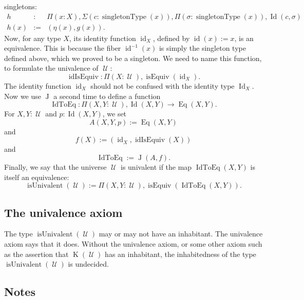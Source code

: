 \documentclass{article}
\newcommand{\Id}{\operatorname{Id}}
\newcommand{\J}{\operatorname{J}}
\newcommand{\K}{\operatorname{K}}
\newcommand{\U}{\operatorname{\mathcal{U}}}
\newcommand{\isEquiv}{\operatorname{isEquiv}}
\newcommand{\Eq}{\operatorname{Eq}}
\newcommand{\singletonType}{\operatorname{singletonType}}
\newcommand{\id}{\operatorname{id}}
\newcommand{\idIsEquiv}{\operatorname{idIsEquiv}}
\newcommand{\IdToEq}{\operatorname{IdToEq}}
\newcommand{\isUnivalent}{\operatorname{isUnivalent}}
\begin{document}
singletons:
\begin{eqnarray*}
   h & : & \Pi(x:X), \Sigma(c:\singletonType(x)), \Pi(\sigma :\singletonType(x)), \Id(c,\sigma )\\
   h(x) & := & (\eta(x),g(x)).
\end{eqnarray*}
Now, for any type $X$, its identity function $\id_X$, defined by
$\id(x) := x$, is an equivalence. This is because the fiber
$\id^{-1}(x)$ is simply the singleton type defined above, which we
proved to be a singleton. We need to name this function, 
to formulate the univalence of $\U$:
\[
   \idIsEquiv : \Pi(X:\U), \isEquiv(\id_X).
 \]
The identity function $\id_X$ should not be confused with the identity
type $\Id_X$. Now we use $\J$ a second time to define a function
\[
   \IdToEq : \Pi(X,Y:\U), \Id(X,Y) \to  \Eq(X,Y).
\]
For $X,Y:\U$ and $p:\Id(X,Y)$, we set
\[
   A(X,Y,p) := \Eq(X,Y)
\]  
and
\[
   f(X) := (\id_X , \idIsEquiv(X))
\]
and
\[
   \IdToEq := \J(A,f).
\]
Finally, we say that the universe $\U$ is univalent if the map
$\IdToEq(X,Y)$ is itself an equivalence:
\[
   \isUnivalent(\U) := \Pi(X,Y:\U), \isEquiv(\IdToEq(X,Y)).
\]

\subsection{The univalence axiom}

The type $\isUnivalent(\U)$ may or may not have an inhabitant. The
univalence axiom says that it does. Without the univalence axiom, or
some other axiom such as the assertion that $\K(\U)$ has an inhabitant,
the inhabitedness of the type $\isUnivalent(\U)$ is undecided.

\subsection{Notes}
\end{document}
